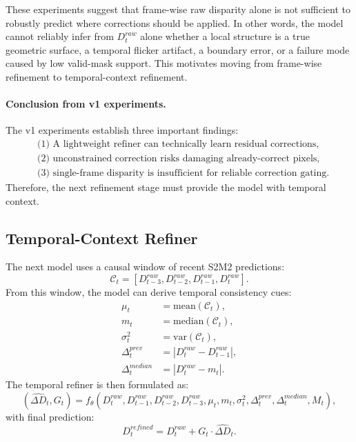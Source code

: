 \documentclass[11pt,a4paper]{article}
\begin{document}
These experiments suggest that frame-wise raw disparity alone is not sufficient
to robustly predict where corrections should be applied. In other words, the
model cannot reliably infer from \(D_t^{raw}\) alone whether a local structure is
a true geometric surface, a temporal flicker artifact, a boundary error, or a
failure mode caused by low valid-mask support. This motivates moving from
frame-wise refinement to temporal-context refinement.

\paragraph{Conclusion from v1 experiments.}
The v1 experiments establish three important findings:
\[
\begin{aligned}
&\text{(1) A lightweight refiner can technically learn residual corrections,} \\
&\text{(2) unconstrained correction risks damaging already-correct pixels,} \\
&\text{(3) single-frame disparity is insufficient for reliable correction gating.}
\end{aligned}
\]
Therefore, the next refinement stage must provide the model with temporal
context.

\subsection{Temporal-Context Refiner}

The next model uses a causal window of recent S2M2 predictions:
\[
\mathcal{C}_t =
\left[
D_{t-3}^{raw},
D_{t-2}^{raw},
D_{t-1}^{raw},
D_t^{raw}
\right].
\]
From this window, the model can derive temporal consistency cues:
\[
\begin{aligned}
\mu_t &= \mathrm{mean}(\mathcal{C}_t), \\
m_t &= \mathrm{median}(\mathcal{C}_t), \\
\sigma_t^2 &= \mathrm{var}(\mathcal{C}_t), \\
\Delta_t^{prev} &= |D_t^{raw} - D_{t-1}^{raw}|, \\
\Delta_t^{median} &= |D_t^{raw} - m_t|.
\end{aligned}
\]
The temporal refiner is then formulated as:
\[
(\widehat{\Delta D}_t, G_t)
=
f_{\theta}
\left(
D_t^{raw},
D_{t-1}^{raw},
D_{t-2}^{raw},
D_{t-3}^{raw},
\mu_t,
m_t,
\sigma_t^2,
\Delta_t^{prev},
\Delta_t^{median},
M_t
\right),
\]
with final prediction:
\[
D_t^{refined}
=
D_t^{raw}
+
G_t \cdot \widehat{\Delta D}_t.
\]
\end{document}
